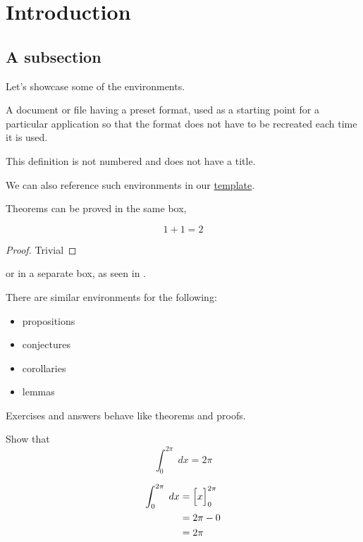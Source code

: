 \section{Introduction}\label{sec:1}
\subsection{A subsection}

Let's showcase some of the environments.
\begin{definition}[title=Template, label=template]
	A document or file having a preset format, used as a starting point for a particular application so that the format does not have to be recreated each time it is used.
\end{definition}
\begin{definition*}
	This definition is not numbered and does not have a title.
\end{definition*}

We can also reference such environments in our \hyperref[def:template]{template}.

Theorems can be proved in the same box,

\begin{theorem}[label=addone]
	\begin{equation*}
		1 + 1 = 2
	\end{equation*}
	\begin{proof}
		Trivial
	\end{proof}
\end{theorem}

or in a separate box, as seen in .

There are similar environments for the following:
\begin{itemize}
	\item propositions
	\item conjectures
	\item corollaries
	\item lemmas
\end{itemize}

Exercises and answers behave like theorems and proofs.
\begin{exercise}
	Show that
	\begin{equation*}
		\int_{0}^{2\pi}\;dx = 2\pi
	\end{equation*}
	\begin{answer}
		\begin{align*}
			\int_{0}^{2\pi}\;dx & = \Bigl[x\Bigr]_{0}^{2\pi} \\
			                    & = 2\pi - 0                 \\
			                    & = 2\pi
		\end{align*}
	\end{answer}
\end{exercise}

